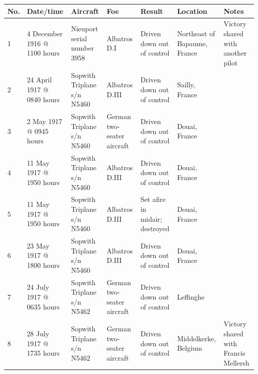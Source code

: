\documentclass{article}
\begin{document}
\begin{tabular}{lllllll}
\toprule
No. & Date/time & Aircraft & Foe & Result & Location & Notes \\
\midrule
1 & 4 December 1916 @ 1100 hours & Nieuport serial number 3958 & Albatros D.I & Driven down out of control & Northeast of Bapaume, France & Victory shared with another pilot \\
2 & 24 April 1917 @ 0840 hours & Sopwith Triplane s/n N5460 & Albatros D.III & Driven down out of control & Sailly, France &  \\
3 & 2 May 1917 @ 0945 hours & Sopwith Triplane s/n N5460 & German two-seater aircraft & Driven down out of control & Douai, France &  \\
4 & 11 May 1917 @ 1950 hours & Sopwith Triplane s/n N5460 & Albatros D.III & Driven down out of control & Douai, France &  \\
5 & 11 May 1917 @ 1950 hours & Sopwith Triplane s/n N5460 & Albatros D.III & Set afire in midair; destroyed & Douai, France &  \\
6 & 23 May 1917 @ 1800 hours & Sopwith Triplane s/n N5460 & Albatros D.III & Driven down out of control & Douai, France &  \\
7 & 24 July 1917 @ 0635 hours & Sopwith Triplane s/n N5462 & German two-seater aircraft & Driven down out of control & Leffinghe &  \\
8 & 28 July 1917 @ 1735 hours & Sopwith Triplane s/n N5462 & German two-seater aircraft & Driven down out of control & Middelkerke, Belgium & Victory shared with Francis Mellersh \\
\bottomrule
\end{tabular}
\end{document}

